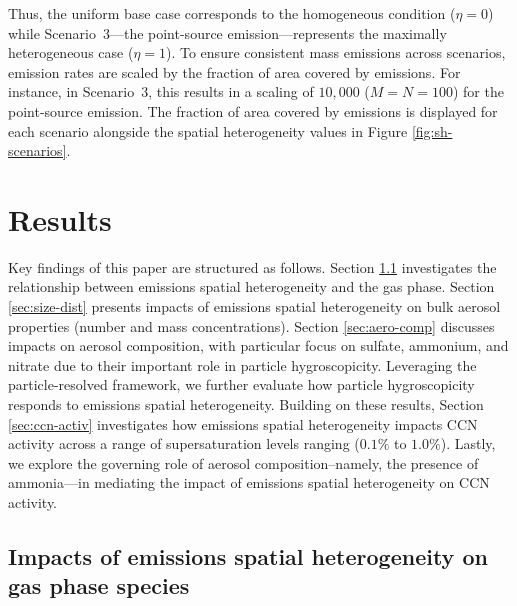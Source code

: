 \documentclass[journal abbreviation, manuscript]{copernicus}
\begin{document}
Thus, the uniform base case corresponds to the homogeneous condition
($\eta = 0$) while Scenario~3---the point-source
emission---represents the maximally heterogeneous case ($\eta =
1$). To ensure consistent mass emissions across scenarios, emission
rates are scaled by the fraction of area covered by emissions. For
instance, in Scenario~3, this results in a scaling of $10,000$
($M=N=100$) for the point-source emission. The fraction of area
covered by emissions is displayed for each scenario alongside the
spatial heterogeneity values in Figure \ref{fig:sh-scenarios}.

\section{Results}\label{results}

Key findings of this paper are structured as follows. Section
\ref{sec:gas-impacts} investigates the relationship between emissions
spatial heterogeneity and the gas phase. Section \ref{sec:size-dist}
presents impacts of emissions spatial heterogeneity on bulk aerosol
properties (number and mass concentrations). Section
\ref{sec:aero-comp} discusses impacts on aerosol composition, with
particular focus on sulfate, ammonium, and nitrate due to their
important role in particle hygroscopicity. Leveraging the
particle-resolved framework, we further evaluate how particle
hygroscopicity responds to emissions spatial heterogeneity. Building
on these results, Section \ref{sec:ccn-activ} investigates how
emissions spatial heterogeneity impacts CCN activity across a range of
supersaturation levels ranging ($0.1\%$ to $1.0\%$). Lastly, we
explore the governing role of aerosol composition--namely, the
presence of ammonia---in mediating the impact of emissions spatial
heterogeneity on CCN activity.

\subsection{Impacts of emissions spatial heterogeneity on gas phase species}\label{sec:gas-impacts}
\end{document}

